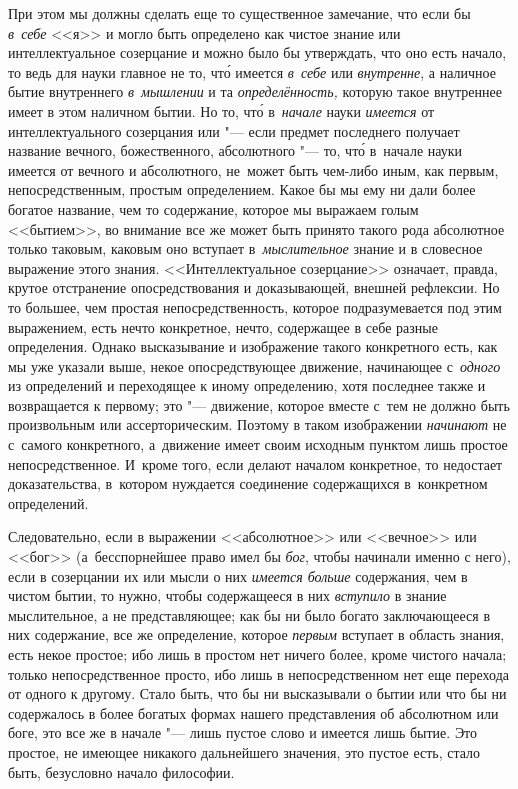 При этом мы должны сделать еще то существенное замечание, что если бы
{\em в~себе} <<я>> и могло быть определено как чистое знание или
интеллектуальное созерцание и можно было бы утверждать, что оно есть начало, то
ведь для науки главное не то, чт\'{о} имеется {\em в~себе} или {\em внутренне},
а наличное бытие внутреннего {\em в~мышлении} и та {\em определённость,}
которую такое внутреннее имеет в этом наличном бытии. Но то, чт\'{о}
в~{\em начале} науки {\em имеется} от интеллектуального созерцания или "---
если предмет последнего получает название вечного, божественного, абсолютного
"--- то, чт\'{о} в~начале науки имеется от вечного и абсолютного, не~может быть
чем-либо иным, как первым, непосредственным, простым определением. Какое бы мы
ему ни дали более богатое название, чем то содержание, которое мы выражаем
голым <<бытием>>, во внимание все же может быть принято такого рода абсолютное
только таковым, каковым оно вступает в~{\em мыслительное} знание и в словесное
выражение этого знания. <<Интеллектуальное созерцание>> означает, правда,
крутое отстранение опосредствования и доказывающей, внешней рефлексии. Но то
большее, чем простая непосредственность, которое подразумевается под этим
выражением, есть нечто конкретное, нечто, содержащее в себе разные определения.
Однако высказывание и изображение такого конкретного есть, как мы уже указали
выше, некое опосредствующее движение, начинающее с~{\em одного} из определений
и переходящее к иному определению, хотя последнее также и возвращается к
первому; это "--- движение, которое вместе с~тем не должно быть произвольным
или ассерторическим. Поэтому в таком изображении {\em начинают} не с~самого
конкретного, а~движение имеет своим исходным пунктом лишь простое
непосредственное. И~кроме того, если делают началом конкретное, то недостает
доказательства, в~котором нуждается соединение содержащихся в~конкретном
определений.

Следовательно, если в выражении <<абсолютное>> или <<вечное>> или <<бог>>
(а~бесспорнейшее право имел бы {\em бог}, чтобы начинали именно с него), если
в созерцании их или мысли о них {\em имеется больше} содержания, чем в чистом
бытии, то нужно, чтобы содержащееся в них {\em вступило} в знание мыслительное,
а не представляющее; как бы ни было богато заключающееся в них содержание, все
же определение, которое {\em первым} вступает в область знания, есть некое
простое; ибо лишь в простом нет ничего более, кроме чистого начала; только
непосредственное просто, ибо лишь в непосредственном нет еще перехода от одного
к другому. Стало быть, что бы ни высказывали о бытии или что бы ни содержалось
в более богатых формах нашего представления об абсолютном или боге, это все же
в начале "--- лишь пустое слово и имеется лишь бытие. Это простое, не имеющее
никакого дальнейшего значения, это пустое есть, стало быть, безусловно начало
философии.

